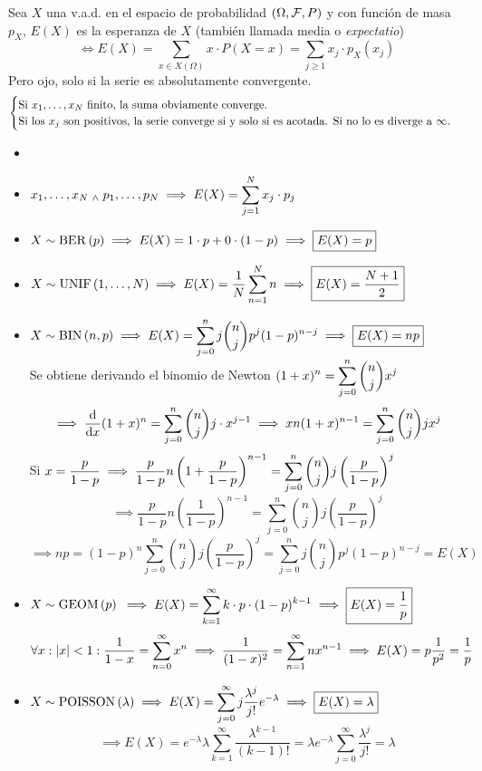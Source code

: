 \begin{defn}[Esperanza]
	Sea $X$ una v.a.d. en el espacio de probabilidad $(\Omega, \mathcal{F}, P)$ y con función de masa $p_X$, $E(X)$ es la esperanza de $X$ (también llamada media o \emph{expectatio})
	\[\iff E(X)=\sum_{x\in X(\Omega)}x\cdot P(X=x)=\sum_{j\geq 1}x_j\cdot p_X(x_j)\]
	Pero ojo, solo si la serie es absolutamente convergente.
	\[\begin{cases} \text{Si $x_1, \dots, x_N$ finito, la suma obviamente converge.} \\
			\text{Si los $x_j$ son positivos, la serie converge si y solo si es acotada. Si no lo es diverge a $\infty$.}\end{cases}\]
\end{defn}
\newpage
{}
\vspace{-1.25cm}
\begin{ejem}
	\begin{itemize}[topsep=1pt, itemsep=1pt,parsep=3pt]
		\item[]
		\item $\displaystyle x_1, \dots, x_N \; _{\wedge} \; p_1, \dots, p_N \implies E(X)=\sum_{j=1}^N x_j\cdot p_j$
		\item $\displaystyle X\sim\operatorname{BER}\left(p\right) \implies E(X)=1\cdot p+0\cdot(1-p)\implies \boxed{E(X)=p}$
		\item $\displaystyle X\sim\operatorname{UNIF}\left(1, \dots, N\right) \implies E(X)=\frac{1}{N}\sum_{n=1}^N n \implies \boxed{E(X)=\frac{N+1}{2}}$
		\item $\displaystyle X\sim\operatorname{BIN}\left(n, p\right) \implies E(X)=\sum_{j=0}^n j\binom{n}{j}p^j(1-p)^{n-j}\implies \boxed{E(X)=np}$ \\
		      Se obtiene derivando el binomio de Newton $\displaystyle (1+x)^n=\sum_{j=0}^n \binom{n}{j} x^j$
		      \[\implies \odv{}{x}(1+x)^n=\sum_{j=0}^n \binom{n}{j} j\cdot x^{j-1} \implies xn(1+x)^{n-1}=\sum_{j=0}^n \binom{n}{j} jx^{j}\]
		      Si $\displaystyle x=\frac{p}{1-p} \implies
			      \frac{p}{1-p}n\left(1+\frac{p}{1-p}\right)^{n-1}=\sum_{j=0}^n \binom{n}{j}
			      j\left(\frac{p}{1-p}\right)^{j}$
		      \[\implies \frac{p}{1-p}n\left(\frac{1}{1-p}\right)^{n-1}=\sum_{j=0}^n \binom{n}{j} j\left(\frac{p}{1-p}\right)^{j}\]
		      \[\implies np=(1-p)^n\sum_{j=0}^n \binom{n}{j} j\left(\frac{p}{1-p}\right)^{j} = \sum_{j=0}^n j\binom{n}{j}p^j(1-p)^{n-j} = E(X)\]
		      \hfill \qedsymbol
		\item $X\sim \operatorname{GEOM}\left(p\right)$ $\displaystyle \implies E(X)=\sum_{k=1}^\infty k\cdot p\cdot(1-p)^{k-1} \implies \boxed{E(X)=\frac{1}{p}}$
		      \[\forall  x :\left|x\right|<1: \frac{1}{1-x}=\sum_{n=0}^\infty x^n\implies \frac{1}{(1-x)^2}=\sum_{n=1}^\infty nx^{n-1}\implies E(X)= p \frac{1}{p^2}=\frac{1}{p}\]
		      \hfill \qedsymbol
		\item $\displaystyle X\sim\operatorname{POISSON}\left(\lambda\right) \implies E(X)=\sum_{j=0}^\infty j\frac{\lambda^j}{j!}e^{-\lambda}\implies \boxed{E(X)=\lambda}$
		      \[\implies E(X)=e^{-\lambda}\lambda\sum_{k=1}^\infty \frac{\lambda^{k-1}}{(k-1)!}=\lambda e^{-\lambda}\sum_{j=0}^{\infty} \frac{\lambda^j}{j!}=\lambda\]
		      \hfill \qedsymbol
	\end{itemize}
\end{ejem}

